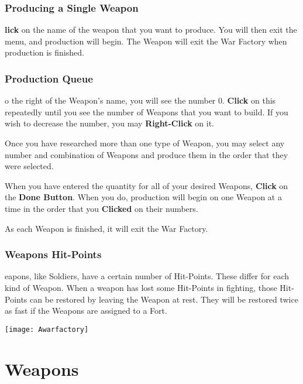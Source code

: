 \subsubsection{\textsf{Producing a Single Weapon}}

\textbf{lick} on the name of the weapon that you want to produce. You will then exit the menu, and production will begin. The Weapon will exit the War Factory when production is finished.

\subsubsection{\textsf{Production Queue}}

o the right of the Weapon’s name, you will see the number 0. \textbf{Click} on this repeatedly until you see the number of Weapons that you want to build. If you wish to decrease the number, you may \textbf{Right-Click} on it.

Once you have researched more than one type of Weapon, you may select any number and combination of Weapons and produce them in the order that they were selected.

When you have entered the quantity for all of your desired Weapons, \textbf{Click} on the \textbf{Done Button}. When you do, production will begin on one Weapon at a time in the order that you \textbf{Clicked} on their numbers.

As each Weapon is finished, it will exit the War Factory.

\subsubsection{\textsf{Weapons Hit-Points}}


eapons, like Soldiers, have a certain number of Hit-Points. These differ for each kind of Weapon. When a weapon has lost some Hit-Points in fighting, those Hit-Points can be restored by leaving the Weapon at rest. They will be restored twice as fast if the Weapons are assigned to a Fort.

\begin{center}
    \texttt{[image: Awarfactory]} %
\end{center}

\section{\textsf{Weapons}}

